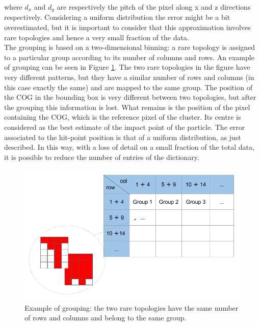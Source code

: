 where $d_x$ and $d_y$ are respectively the pitch of the pixel along x and z directions respectively.
Considering a uniform distribution the error might be a bit overestimated, but it is important to consider that this approximation involves rare topologies and hence a very small fraction of the data.\\
The grouping is based on a two-dimensional binning: a rare topology is assigned to a particular group according to its number of columns and rows. An example of grouping can be seen in Figure \ref{fig:gruppi}. The two rare topologies in the figure have very different patterns, but they have a similar number of rows and columns (in this case exactly the same) and are mapped to the same group. The position of the COG in the bounding box is very different between two topologies, but after the grouping this information is lost. What remains is the position of the pixel containing the COG, which is the reference pixel of the cluster. Its centre is considered as the best estimate of the impact point of the particle. The error associated to the hit-point position is that of a uniform distribution, as just described. In this way, with a loss of detail on a small fraction of the total data, it is possible to reduce the number of entries of the dictionary.
%
\begin{figure}
  \centering
  \includegraphics[scale=0.5]{figures/gruppi.png}
  \caption{Example of grouping: the two rare topologies have the same number of rows and columns and belong to the same group.}
  \label{fig:gruppi}
\end{figure}
%
